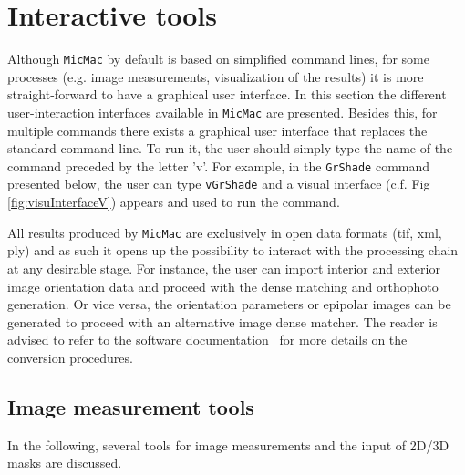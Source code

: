 \documentclass[twocolumn]{bmcart}%
\begin{document}
\section*{Interactive tools}
Although {\tt MicMac} by default is based on simplified command lines, for some processes (e.g. image measurements, visualization of the results)  it is more straight-forward to have a graphical user interface. In this section the different user-interaction interfaces available in {\tt MicMac} are presented. Besides this, for multiple commands there exists a graphical user interface that replaces the standard command line. To run it, the user should simply type the name of the command preceded by the letter 'v'. For example, in the {\tt GrShade} command presented below, the user can type {\tt vGrShade} and a visual interface (c.f. Fig  \ref{fig:visuInterfaceV}) appears and used to run the command.\par 
%
All results produced by {\tt MicMac} are exclusively in open data formats (tif, xml, ply) and as such it opens up the possibility to interact with the processing chain at any desirable stage. For instance, the user can import interior and exterior image orientation data and proceed with the dense matching and orthophoto generation. Or vice versa, the orientation parameters or epipolar images can be generated to proceed with an alternative image dense matcher. The reader is advised to refer to the software documentation~\cite{micmac:manual} for more details on the conversion procedures. 
 
\subsection*{Image measurement tools}
In the following, several tools for image measurements and the input of 2D/3D masks are discussed.
\end{document}
